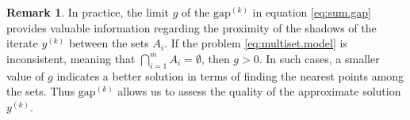 \documentclass[12pt]{article}
\theoremstyle{definition}
\newtheorem{remark}{Remark}
\begin{document}
\begin{remark}\label{rm:use.of.gap}
In practice, the limit $g$ of the $\mbox{gap}^{(k)}$ in equation \eqref{eq:sum.gap} provides valuable information regarding the proximity of the shadows of the iterate $y^{(k)}$ between the sets $A_i$.
If the problem \eqref{eq:multiset.model} is inconsistent, meaning that $\bigcap_{i=1}^m A_i=\emptyset$, then $g> 0$. 
In such cases, a smaller value of $g$ indicates a better solution in terms of finding the nearest points among the sets.
Thus $\mbox{gap}^{(k)}$ allows us to assess the quality of the approximate solution $y^{(k)}$.
\end{remark}

%

%
% 
\end{document}
